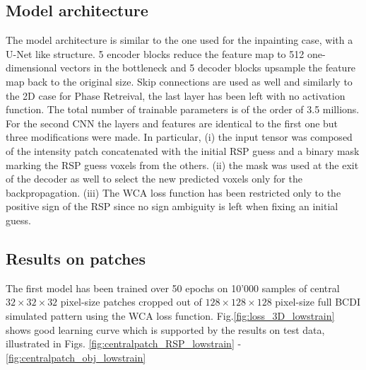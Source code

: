 \subsection{Model architecture}\label{chp:3d_patch_model} 
The model architecture is similar to the one used for the inpainting case, with a U-Net like structure. 
5 encoder blocks reduce the feature map to 512 one-dimensional vectors in the bottleneck and 5 decoder blocks upsample 
the feature map back to the original size. Skip connections are used as well and similarly to the 2D case for Phase Retreival, 
the last layer has been left with no activation function. The total number of trainable parameters is of the order of 3.5 millions. \\
For the second CNN the layers and features are identical to the first one but three modifications were made. 
In particular, (i) the input tensor was composed of the intensity patch concatenated with the initial RSP guess and a binary 
mask marking the RSP guess voxels from the others. (ii) the mask was used at the exit of the decoder as well to 
select the new predicted voxels only for the backpropagation. 
(iii) The WCA loss function has been restricted only to the positive sign of the RSP since no sign ambiguity is left 
when fixing an initial guess. 

\subsection{Results on patches}

The first model has been trained over 50 epochs on 10'000 samples of central $32\times32\times32$ pixel-size patches 
cropped out of $128\times128\times128$ pixel-size full BCDI simulated pattern using the WCA loss function. 
Fig.\ref{fig:loss_3D_lowstrain} shows good learning curve which is supported by the results on test data, illustrated 
in Figs. \ref{fig:centralpatch_RSP_lowstrain} - \ref{fig:centralpatch_obj_lowstrain}

